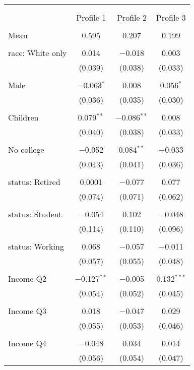 
\begin{tabular}{@{\extracolsep{5pt}}lccc} 
\\[-1.8ex]\hline 
\hline \\[-1.8ex] 
\\[-1.8ex] & Profile 1 & Profile 2 & Profile 3 \\ 
\hline \\[-1.8ex] 
 Mean & 0.595 & 0.207 & 0.199  \\ \hline \\[-1.8ex] race: White only & 0.014 & $-$0.018 & 0.003 \\ 
  & (0.039) & (0.038) & (0.033) \\ 
  & & & \\ 
 Male & $-$0.063$^{*}$ & 0.008 & 0.056$^{*}$ \\ 
  & (0.036) & (0.035) & (0.030) \\ 
  & & & \\ 
 Children & 0.079$^{**}$ & $-$0.086$^{**}$ & 0.008 \\ 
  & (0.040) & (0.038) & (0.033) \\ 
  & & & \\ 
 No college & $-$0.052 & 0.084$^{**}$ & $-$0.033 \\ 
  & (0.043) & (0.041) & (0.036) \\ 
  & & & \\ 
 status: Retired & 0.0001 & $-$0.077 & 0.077 \\ 
  & (0.074) & (0.071) & (0.062) \\ 
  & & & \\ 
 status: Student & $-$0.054 & 0.102 & $-$0.048 \\ 
  & (0.114) & (0.110) & (0.096) \\ 
  & & & \\ 
 status: Working & 0.068 & $-$0.057 & $-$0.011 \\ 
  & (0.057) & (0.055) & (0.048) \\ 
  & & & \\ 
 Income Q2 & $-$0.127$^{**}$ & $-$0.005 & 0.132$^{***}$ \\ 
  & (0.054) & (0.052) & (0.045) \\ 
  & & & \\ 
 Income Q3 & 0.018 & $-$0.047 & 0.029 \\ 
  & (0.055) & (0.053) & (0.046) \\ 
  & & & \\ 
 Income Q4 & $-$0.048 & 0.034 & 0.014 \\ 
  & (0.056) & (0.054) & (0.047) \\ 

\end{tabular}
